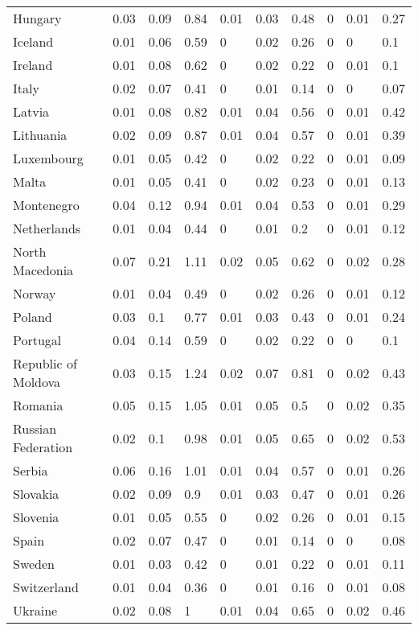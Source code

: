\begin{longtable}[t]{llllllllll}
Hungary & 0.03 & 0.09 & 0.84 & 0.01 & 0.03 & 0.48 & 0 & 0.01 & 0.27\\
Iceland & 0.01 & 0.06 & 0.59 & 0 & 0.02 & 0.26 & 0 & 0 & 0.1\\
Ireland & 0.01 & 0.08 & 0.62 & 0 & 0.02 & 0.22 & 0 & 0.01 & 0.1\\
Italy & 0.02 & 0.07 & 0.41 & 0 & 0.01 & 0.14 & 0 & 0 & 0.07\\
Latvia & 0.01 & 0.08 & 0.82 & 0.01 & 0.04 & 0.56 & 0 & 0.01 & 0.42\\
Lithuania & 0.02 & 0.09 & 0.87 & 0.01 & 0.04 & 0.57 & 0 & 0.01 & 0.39\\
Luxembourg & 0.01 & 0.05 & 0.42 & 0 & 0.02 & 0.22 & 0 & 0.01 & 0.09\\
Malta & 0.01 & 0.05 & 0.41 & 0 & 0.02 & 0.23 & 0 & 0.01 & 0.13\\
Montenegro & 0.04 & 0.12 & 0.94 & 0.01 & 0.04 & 0.53 & 0 & 0.01 & 0.29\\
Netherlands & 0.01 & 0.04 & 0.44 & 0 & 0.01 & 0.2 & 0 & 0.01 & 0.12\\
North Macedonia & 0.07 & 0.21 & 1.11 & 0.02 & 0.05 & 0.62 & 0 & 0.02 & 0.28\\
Norway & 0.01 & 0.04 & 0.49 & 0 & 0.02 & 0.26 & 0 & 0.01 & 0.12\\
Poland & 0.03 & 0.1 & 0.77 & 0.01 & 0.03 & 0.43 & 0 & 0.01 & 0.24\\
Portugal & 0.04 & 0.14 & 0.59 & 0 & 0.02 & 0.22 & 0 & 0 & 0.1\\
Republic of Moldova & 0.03 & 0.15 & 1.24 & 0.02 & 0.07 & 0.81 & 0 & 0.02 & 0.43\\
Romania & 0.05 & 0.15 & 1.05 & 0.01 & 0.05 & 0.5 & 0 & 0.02 & 0.35\\
Russian Federation & 0.02 & 0.1 & 0.98 & 0.01 & 0.05 & 0.65 & 0 & 0.02 & 0.53\\
Serbia & 0.06 & 0.16 & 1.01 & 0.01 & 0.04 & 0.57 & 0 & 0.01 & 0.26\\
Slovakia & 0.02 & 0.09 & 0.9 & 0.01 & 0.03 & 0.47 & 0 & 0.01 & 0.26\\
Slovenia & 0.01 & 0.05 & 0.55 & 0 & 0.02 & 0.26 & 0 & 0.01 & 0.15\\
Spain & 0.02 & 0.07 & 0.47 & 0 & 0.01 & 0.14 & 0 & 0 & 0.08\\
Sweden & 0.01 & 0.03 & 0.42 & 0 & 0.01 & 0.22 & 0 & 0.01 & 0.11\\
Switzerland & 0.01 & 0.04 & 0.36 & 0 & 0.01 & 0.16 & 0 & 0.01 & 0.08\\
Ukraine & 0.02 & 0.08 & 1 & 0.01 & 0.04 & 0.65 & 0 & 0.02 & 0.46\\

\end{longtable}
